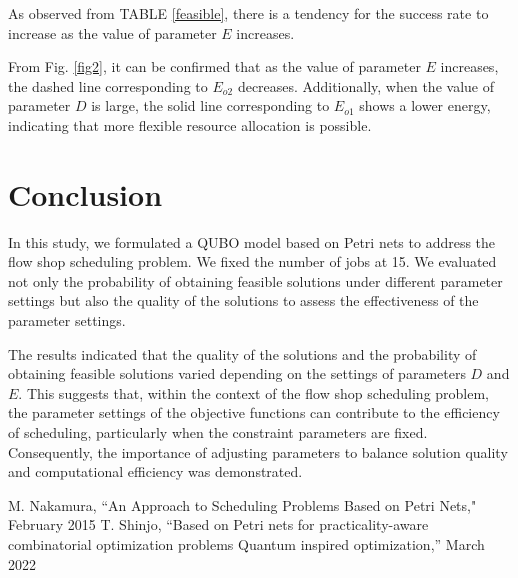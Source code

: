\documentclass[conference]{IEEEtran}
\begin{document}

As observed from TABLE \ref{feasible}, there is a tendency for the success rate to increase as the value of parameter $E$ increases.

From Fig. \ref{fig2}, it can be confirmed that as the value of parameter $E$ increases, the dashed line corresponding to $E_{o2}$ decreases. Additionally, when the value of parameter $D$ is large, the solid line corresponding to $E_{o1}$ shows a lower energy, indicating that more flexible resource allocation is possible.

\section{Conclusion}
In this study, we formulated a QUBO model based on Petri nets to address the flow shop scheduling problem. We fixed the number of jobs at 15. We evaluated not only the probability of obtaining feasible solutions under different parameter settings but also the quality of the solutions to assess the effectiveness of the parameter settings.

The results indicated that the quality of the solutions and the probability of obtaining feasible solutions varied depending on the settings of parameters $D$ and $E$. This suggests that, within the context of the flow shop scheduling problem, the parameter settings of the objective functions can contribute to the efficiency of scheduling, particularly when the constraint parameters are fixed. Consequently, the importance of adjusting parameters to balance solution quality and computational efficiency was demonstrated.

\begin{thebibliography}{00}
 M. Nakamura, ``An Approach to Scheduling Problems Based on Petri Nets," February 2015
 T. Shinjo, ``Based on Petri nets for practicality-aware combinatorial optimization problems Quantum inspired optimization,'' March 2022
\end{thebibliography}
\end{document}
